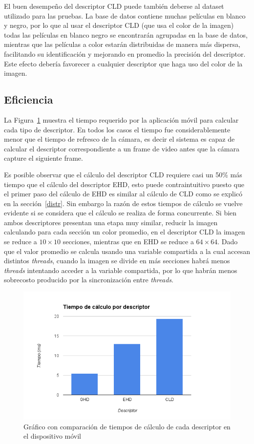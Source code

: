El buen desempeño del descriptor CLD puede también deberse al dataset utilizado para las pruebas. La base de datos contiene muchas películas en blanco y negro, por lo que al usar el descriptor CLD (que usa el color de la imagen) todas las películas en blanco negro se encontrarán agrupadas en la base de datos, mientras que las películas a color estarán distribuidas de manera más dispersa, facilitando su identificación y mejorando en promedio la precisión del descriptor. Este efecto debería favorecer a cualquier descriptor que haga uso del color de la imagen.

\subsection{Eficiencia}
La Figura~\ref{resultados_tiempo_descriptor} muestra el tiempo requerido por la aplicación móvil para calcular cada tipo de descriptor. En todos los casos el tiempo fue considerablemente menor que el tiempo de refresco de la cámara, es decir el sistema es capaz de calcular el descriptor correspondiente a un frame de video antes que la cámara capture el siguiente frame.

Es posible observar que el cálculo del descriptor CLD requiere casi un 50\% más tiempo que el cálculo del descriptor EHD, esto puede contraintuitivo puesto que el primer paso del cálculo de EHD es similar al cálculo de CLD como se explicó en la sección~\ref{distr}. Sin embargo la razón de estos tiempos de cálculo se vuelve evidente si se considera que el cálculo se realiza de forma concurrente. Si bien ambos descriptores presentan una etapa muy similar, reducir la imagen calculando para cada sección un color promedio, en el descriptor CLD la imagen se reduce a $10 \times 10$ secciones, mientras que en EHD se reduce a $64 \times 64$. Dado que el valor promedio se calcula usando una variable compartida a la cual accesan distintos \emph{threads}, cuando la imagen se divide en más secciones habrá menos \emph{threads} intentando acceder a la variable compartida, por lo que habrán menos sobrecosto producido por la sincronización entre \emph{threads}. 

\begin{figure}[!h]
		\centering
		\includegraphics[width=\textwidth]{imagenes/cap5/resultados_tiempo_descriptor.png}
		\caption{Gráfico con comparación de tiempos de cálculo de cada descriptor en el dispositivo móvil}
		\label{resultados_tiempo_descriptor}
	\end{figure}

